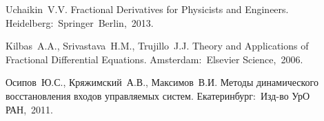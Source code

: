 


%

\begin{thebibliography}{9} %
Uchaikin~V.V.
Fractional Derivatives for Physicists and Engineers. 
Heidelberg:~Springer~Berlin,~2013.

Kilbas~A.A., Srivastava~H.M., Trujillo~J.J.
Theory and Applications of Fractional Differential Equations.
Amsterdam:~Elsevier Science,~2006.

Осипов~Ю.С., Кряжимский~А.В., Максимов~В.И.
Методы динамического восстановления входов управляемых систем. 
Екатеринбург:~Изд-во УрО РАН,~2011.





\end{thebibliography}





%